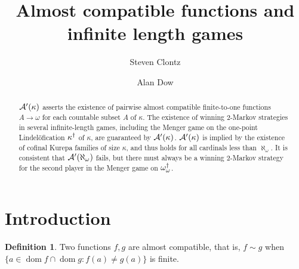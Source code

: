 \documentclass{rmmcart}
\theoremstyle{plain}
\theoremstyle{definition}
\newtheorem{definition}[theorem]{Definition}
\theoremstyle{remark}
\theoremstyle{plain}
\theoremstyle{definition}
\theoremstyle{remark}
\def\dom{\mathop{dom}}
\begin{document}
\title{Almost compatible functions and infinite length games}




\author{Steven Clontz}
\address{Department of Mathematics and Statistics,
The University of South Alabama,
Mobile, AL 36606}
\author{Alan Dow}
\address{Department of Mathematics and Statistics, UNC Charlotte,
Charlotte, NC 28262}







\begin{abstract}
  \(\mathcal{A}'(\kappa)\) asserts the existence of pairwise
  almost compatible finite-to-one functions \(A\to\omega\) for each
  countable subset \(A\) of \(\kappa\).
  The existence of winning \(2\)-Markov strategies in
  several infinite-length games, including
  the Menger game on the one-point Lindel\"ofication \(\kappa^\dagger\)
  of \(\kappa\), are guaranteed by \(\mathcal{A}'(\kappa)\). \(\mathcal{A}'(\kappa)\) is
  implied by the existence of cofinal Kurepa families of size \(\kappa\),
  and thus holds for all cardinals less than \(\aleph_\omega\).
  It is consistent that \(\mathcal{A}'(\aleph_\omega)\) fails, but
  there must always be a winning \(2\)-Markov strategy for the second
  player in the Menger game on \(\omega_\omega^\dagger\).
\end{abstract}


\maketitle
{}






\section{Introduction}

  \begin{definition}
    Two functions \(f,g\) are almost compatible, that is, \(f\sim g\) when
    \(\{a\in\dom f\cap\dom g:f(a)\not=g(a)\}\) is finite.
  \end{definition}
\end{document}
